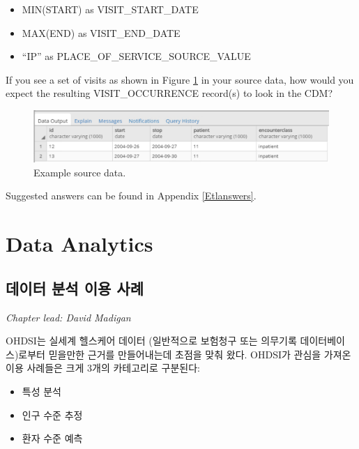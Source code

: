 \documentclass[11pt]{book}
\providecommand{\tightlist}{%
  \setlength{\itemsep}{0pt}\setlength{\parskip}{0pt}}
\theoremstyle{definition}
\theoremstyle{definition}
\theoremstyle{definition}
\theoremstyle{remark}
\begin{document}
\begin{itemize}
\tightlist
\item
  MIN(START) as VISIT\_START\_DATE
\item
  MAX(END) as VISIT\_END\_DATE
\item
  ``IP'' as PLACE\_OF\_SERVICE\_SOURCE\_VALUE
\end{itemize}

If you see a set of visits as shown in Figure
\ref{fig:exerciseSourceData} in your source data, how would you expect
the resulting VISIT\_OCCURRENCE record(s) to look in the CDM?

\begin{figure}

{\centering \includegraphics[width=1\linewidth]{images/ExtractTransformLoad/exerciseSourceData} 

}

\caption{Example source data.}\label{fig:exerciseSourceData}
\end{figure}

Suggested answers can be found in Appendix \ref{Etlanswers}.

\part{Data Analytics}\label{part-data-analytics}

\chapter{데이터 분석 이용 사례}\label{DataAnalyticsUseCases}

\emph{Chapter lead: David Madigan}

OHDSI는 실세계 헬스케어 데이터 (일반적으로 보험청구 또는 의무기록
데이터베이스)로부터 믿을만한 근거를 만들어내는데 초점을 맞춰 왔다.
OHDSI가 관심을 가져온 이용 사례들은 크게 3개의 카테고리로 구분된다:

\begin{itemize}
\tightlist
\item
  특성 분석
\item
  인구 수준 추정
\item
  환자 수준 예측
\end{itemize}
\end{document}
